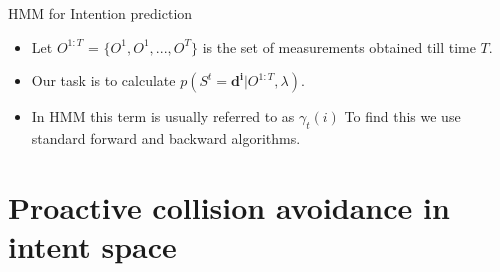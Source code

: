 \documentclass{beamer}
\begin{document}
\begin{frame}{HMM for Intention prediction}
\begin{itemize}
\item{Let $O^{1:T}$ = $\{O^1,O^1,...,O^T\}$ is the set of measurements obtained till time $T$.}
\item{Our task is to calculate $p(S^t = \mathbf{d^i} | O^{1:T} 
,\lambda)$.}

\item{ In HMM this term is usually referred to as $\gamma_t(i)$ To find this we use standard forward and backward algorithms.}
\end{itemize}

\end{frame}


\section{Proactive collision avoidance in intent space}
\end{document}
